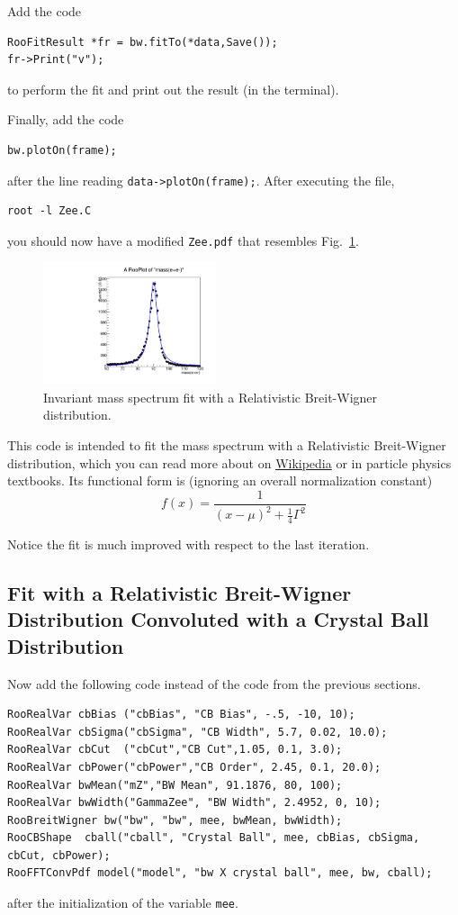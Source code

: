 \documentclass{article}
\begin{document}
Add the code 
\begin{verbatim}
RooFitResult *fr = bw.fitTo(*data,Save());
fr->Print("v");  
\end{verbatim}
to perform the fit and print out the result (in the terminal).

Finally, add the code
\begin{verbatim}
bw.plotOn(frame);
\end{verbatim}
after the line reading \texttt{data->plotOn(frame);}. After executing the file, 
\begin{verbatim}
root -l Zee.C
\end{verbatim}
you should now have a modified \texttt{Zee.pdf} that resembles Fig.~\ref{fig:Zee_bw}.
\begin{figure}
    \centering
    \includegraphics[width=2.0in]{Zee_bw.pdf}
    \caption{Invariant mass spectrum fit with a Relativistic Breit-Wigner distribution.}
    \label{fig:Zee_bw}
\end{figure} 

This code is intended to fit the mass spectrum with a Relativistic
Breit-Wigner distribution, which you can read more about on
\href{http://en.wikipedia.org/wiki/Relativistic_Breit\%E2\%80\%93Wigner_distribution}{Wikipedia}
or in particle physics textbooks. Its functional form is (ignoring an overall normalization constant)
\begin{equation}
f(x) = \frac{1}{(x-\mu)^2+\frac{1}{4}\Gamma^2}
\end{equation}

Notice the fit is much improved with respect to the last iteration.

\subsection{Fit with a Relativistic Breit-Wigner Distribution Convoluted with a Crystal Ball Distribution}
Now add the following code instead of the code from the previous sections.
\begin{verbatim}
RooRealVar cbBias ("cbBias", "CB Bias", -.5, -10, 10);
RooRealVar cbSigma("cbSigma", "CB Width", 5.7, 0.02, 10.0);
RooRealVar cbCut  ("cbCut","CB Cut",1.05, 0.1, 3.0);                              
RooRealVar cbPower("cbPower","CB Order", 2.45, 0.1, 20.0);
RooRealVar bwMean("mZ","BW Mean", 91.1876, 80, 100);
RooRealVar bwWidth("GammaZee", "BW Width", 2.4952, 0, 10);
RooBreitWigner bw("bw", "bw", mee, bwMean, bwWidth);
RooCBShape  cball("cball", "Crystal Ball", mee, cbBias, cbSigma, cbCut, cbPower);
RooFFTConvPdf model("model", "bw X crystal ball", mee, bw, cball);
\end{verbatim}
after the initialization of the variable \texttt{mee}.
\end{document}
